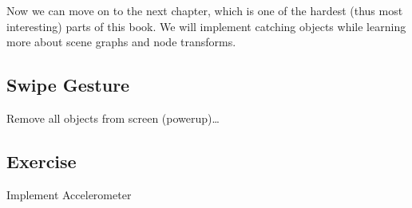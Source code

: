 Now we can move on to the next chapter, which is one of the hardest (thus most
interesting) parts of this book. We will implement catching objects while
learning more about scene graphs and node transforms.

\subsection{Swipe Gesture}
Remove all objects from screen (powerup)\ldots

\subsection{Exercise}
Implement Accelerometer
